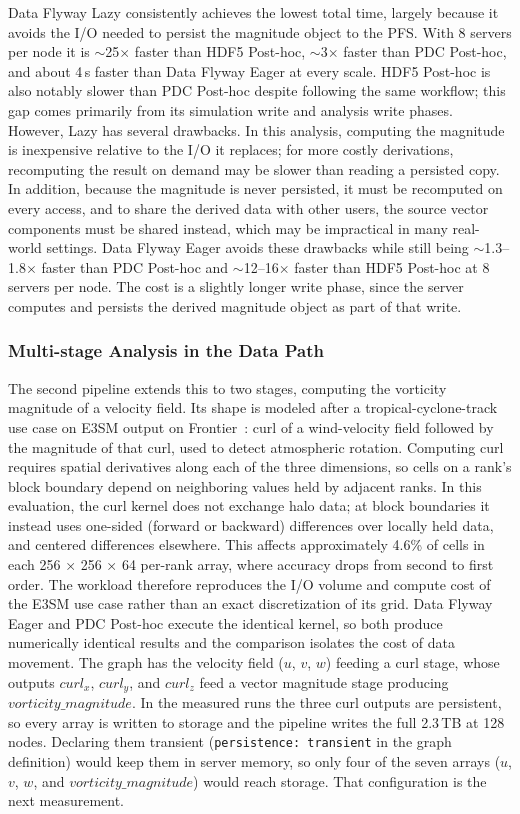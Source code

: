 Data Flyway Lazy consistently achieves the lowest total time, largely because it avoids the I/O needed to persist the magnitude object to the PFS. With 8 servers per node it is $\sim$25$\times$ faster than HDF5 Post-hoc, $\sim$3$\times$ faster than PDC Post-hoc, and about 4\,s faster than Data Flyway Eager at every scale. HDF5 Post-hoc is also notably slower than PDC Post-hoc despite following the same workflow; this gap comes primarily from its simulation write and analysis write phases. However, Lazy has several drawbacks. In this analysis, computing the magnitude is inexpensive relative to the I/O it replaces; for more costly derivations, recomputing the result on demand may be slower than reading a persisted copy. In addition, because the magnitude is never persisted, it must be recomputed on every access, and to share the derived data with other users, the source vector components must be shared instead, which may be impractical in many real-world settings. Data Flyway Eager avoids these drawbacks while still being $\sim$1.3--1.8$\times$ faster than PDC Post-hoc and $\sim$12--16$\times$ faster than HDF5 Post-hoc at 8 servers per node. The cost is a slightly longer write phase, since the server computes and persists the derived magnitude object as part of that write. 

\subsubsection{Multi-stage Analysis in the Data Path}
\label{sec:curl-vorticity-eval}

The second pipeline extends this to two stages, computing the vorticity magnitude of a velocity field. Its shape is modeled after a tropical-cyclone-track use case on E3SM output on Frontier~\cite{e3sm}: curl of a wind-velocity field followed by the magnitude of that curl, used to detect atmospheric rotation. Computing curl requires spatial derivatives along each of the three dimensions, so cells on a rank's block boundary depend on neighboring values held by adjacent ranks. In this evaluation, the curl kernel does not exchange halo data; at block boundaries it instead uses one-sided (forward or backward) differences over locally held data, and centered differences elsewhere. This affects approximately 4.6\% of cells in each 256 × 256 × 64 per-rank array, where accuracy drops from second to first order. The workload therefore reproduces the I/O volume and compute cost of the E3SM use case rather than an exact discretization of its grid. Data Flyway Eager and PDC Post-hoc execute the identical kernel, so both produce numerically identical results and the comparison isolates the cost of data movement. The graph has the velocity field ($u$, $v$, $w$) feeding a curl stage, whose outputs $curl_x$, $curl_y$, and $curl_z$ feed a vector magnitude stage producing $vorticity\_magnitude$. In the measured runs the three curl outputs are persistent, so every array is written to storage and the pipeline writes the full 2.3\,TB at 128 nodes. Declaring them transient (\texttt{persistence: transient} in the graph definition) would keep them in server memory, so only four of the seven arrays ($u$, $v$, $w$, and $vorticity\_magnitude$) would reach storage. That configuration is the next measurement. 

